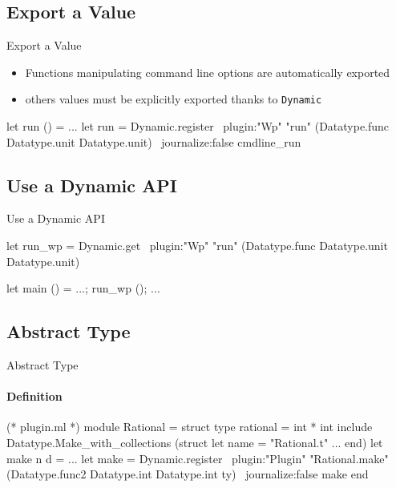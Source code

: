 
\subsection{Export a Value}

\begin{frame}[fragile]{Export a Value}

\begin{itemize}
\item Functions manipulating command line options are automatically exported
\item others values must be explicitly exported thanks to \lstinline+Dynamic+
\end{itemize}

\begin{ocamlcode}
let run () = ...
let run = 
  Dynamic.register ~plugin:"Wp" "run"
    (Datatype.func Datatype.unit Datatype.unit)
    ~journalize:false
    cmdline_run
\end{ocamlcode}

\end{frame}


\subsection{Use a Dynamic API}

\begin{frame}[fragile]{Use a Dynamic API}
\begin{ocamlcode}
let run_wp =
  Dynamic.get ~plugin:"Wp" "run"
    (Datatype.func Datatype.unit Datatype.unit)

let main () = ...; run_wp (); ...
\end{ocamlcode}
\end{frame}


\subsection{Abstract Type}

\begin{frame}[fragile]{Abstract Type}
\framesubtitle{Definition}

\begin{ocamlcode}
(* plugin.ml *)
module Rational = struct
  type rational = int * int
  include Datatype.Make_with_collections
    (struct let name = "Rational.t" ... end)
  let make n d = ...
  let make = 
    Dynamic.register
      ~plugin:"Plugin" "Rational.make"
      (Datatype.func2 
         Datatype.int Datatype.int ty)
      ~journalize:false
      make
end

\end{ocamlcode}
\end{frame}


